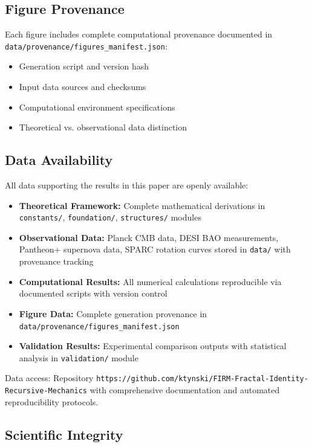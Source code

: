 \documentclass[12pt]{article}
\begin{document}
\subsection{Figure Provenance}

Each figure includes complete computational provenance documented in \texttt{data/provenance/figures\_manifest.json}:
\begin{itemize}
    \item Generation script and version hash
    \item Input data sources and checksums  
    \item Computational environment specifications
    \item Theoretical vs. observational data distinction
\end{itemize}

\subsection{Data Availability}

All data supporting the results in this paper are openly available:

\begin{itemize}
    \item \textbf{Theoretical Framework:} Complete mathematical derivations in \texttt{constants/}, \texttt{foundation/}, \texttt{structures/} modules
    \item \textbf{Observational Data:} Planck CMB data, DESI BAO measurements, Pantheon+ supernova data, SPARC rotation curves stored in \texttt{data/} with provenance tracking
    \item \textbf{Computational Results:} All numerical calculations reproducible via documented scripts with version control
    \item \textbf{Figure Data:} Complete generation provenance in \texttt{data/provenance/figures\_manifest.json}
    \item \textbf{Validation Results:} Experimental comparison outputs with statistical analysis in \texttt{validation/} module
\end{itemize}

Data access: Repository \texttt{https://github.com/ktynski/FIRM-Fractal-Identity-Recursive-Mechanics} with comprehensive documentation and automated reproducibility protocols.

\subsection{Scientific Integrity}
\end{document}
